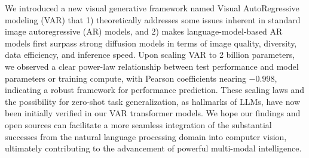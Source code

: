 We introduced a new visual generative framework named Visual AutoRegressive modeling (VAR) that 1) theoretically addresses some issues inherent in standard image autoregressive (AR) models, and 2) makes language-model-based AR models first surpass strong diffusion models in terms of image quality, diversity, data efficiency, and inference speed.
Upon scaling VAR to 2 billion parameters, we observed a clear power-law relationship between test performance and model parameters or training compute, with Pearson coefficients nearing $-0.998$, indicating a robust framework for performance prediction.
These scaling laws and the possibility for zero-shot task generalization, as hallmarks of LLMs, have now been initially verified in our VAR transformer models.
We hope our findings and open sources can facilitate a more seamless integration of the substantial successes from the natural language processing domain into computer vision, ultimately contributing to the advancement of powerful multi-modal intelligence.
